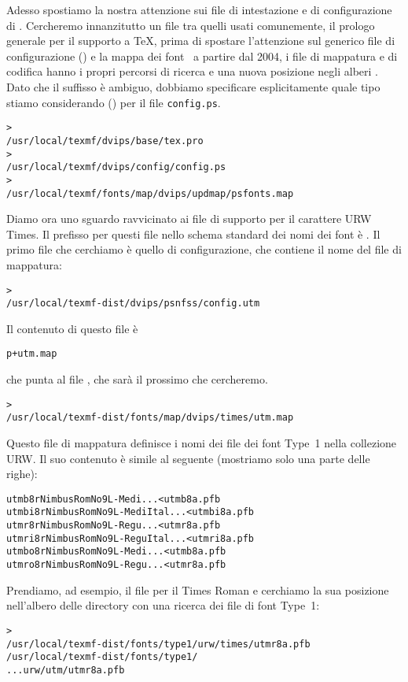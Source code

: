 \documentclass{article}
\begin{document}
Adesso spostiamo la nostra attenzione sui file di intestazione e di
configurazione di . Cercheremo innanzitutto un file tra
quelli usati comunemente, il prologo generale  per il
supporto a \TeX, prima di spostare l'attenzione sul generico file di
configurazione () e la mappa dei font \PS{}
 \Dash\ a partire dal 2004, i file di mappatura e di
codifica hanno i propri percorsi di ricerca e una nuova posizione negli
alberi . Dato che il suffisso  è ambiguo,
dobbiamo specificare esplicitamente quale tipo stiamo considerando
() per il file \texttt{config.ps}.
\begin{alltt}
> 
   /usr/local/texmf/dvips/base/tex.pro
> 
   /usr/local/texmf/dvips/config/config.ps
> 
   /usr/local/texmf/fonts/map/dvips/updmap/psfonts.map
\end{alltt}

Diamo ora uno sguardo ravvicinato ai file di supporto per il carattere
\PS{} URW Times. Il prefisso per questi file nello schema standard dei nomi
dei font è . Il primo file che cerchiamo è quello di
configurazione, che contiene il nome del file di mappatura:
\begin{alltt}
> 
   /usr/local/texmf-dist/dvips/psnfss/config.utm
\end{alltt}
Il contenuto di questo file è
\begin{alltt}
  p +utm.map
\end{alltt}
che punta al file , che sarà il prossimo che cercheremo.
\begin{alltt}
> 
   /usr/local/texmf-dist/fonts/map/dvips/times/utm.map
\end{alltt}
Questo file di mappatura definisce i nomi dei file dei font \PS{} Type~1
nella collezione URW. Il suo contenuto è simile al seguente (mostriamo
solo una parte delle righe):
\begin{alltt}
utmb8r  NimbusRomNo9L-Medi    ... <utmb8a.pfb
utmbi8r NimbusRomNo9L-MediItal... <utmbi8a.pfb
utmr8r  NimbusRomNo9L-Regu    ... <utmr8a.pfb
utmri8r NimbusRomNo9L-ReguItal... <utmri8a.pfb
utmbo8r NimbusRomNo9L-Medi    ... <utmb8a.pfb
utmro8r NimbusRomNo9L-Regu    ... <utmr8a.pfb
\end{alltt}
Prendiamo, ad esempio, il file per il Times Roman  e
cerchiamo la sua posizione nell'albero delle directory  con
una ricerca dei file di font Type~1:
\begin{alltt}
> 
\ifSingleColumn   /usr/local/texmf-dist/fonts/type1/urw/times/utmr8a.pfb
\else   /usr/local/texmf-dist/fonts/type1/
... urw/utm/utmr8a.pfb
\fi\end{alltt}
\end{document}
